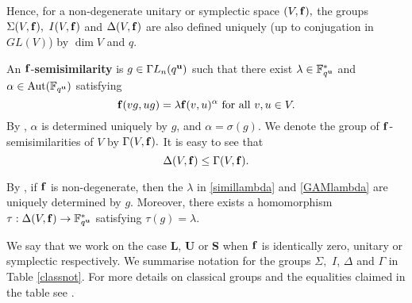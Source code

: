 Hence, for a non-degenerate unitary or symplectic space $(V, {\bf f}),$ the groups $\Sigma(V, {\bf f}),$ $I(V, {\bf f})$ and $\Delta(V, {\bf f})$ are also defined uniquely (up to conjugation in $GL(V)$) by $\dim V$ and $q.$ 



An ${\bf f}$-{\bf semisimilarity}  is $g \in {{\Gamma L}}_n(q^{\bf u})$ such that there exist $\lambda \in \mathbb{F}_{q^{\bf u}}^*$ and $\alpha \in \mathrm{Aut} (\mathbb{F}_{q^{\bf u}})$ satisfying
\begin{equation}
\label{GAMlambda}{\bf f}(vg,ug)=\lambda{\bf f}(v,u)^{\alpha} \text{ for all } v,u \in V.
\end{equation}
By \cite[Lemma 2.1.2]{kleidlieb}, $\alpha$ is determined uniquely by $g$, and $\alpha=\sigma(g).$ We denote the group of ${\bf f}$-semisimilarities of $V$ by $\Gamma(V, {\bf f}).$ It is easy to see that 
$$\Delta(V, {\bf f}) \le \Gamma(V, {\bf f}).$$


\begin{Def}
\label{taudef}
By \cite[Lemma 2.1.2]{kleidlieb}, if ${\bf f}$ is non-degenerate, then the $\lambda$ in \eqref{simillambda} and \eqref{GAMlambda} are uniquely determined by $g$. Moreover, there exists a homomorphism $\tau:\Delta(V, {\bf f}) \to \mathbb{F}_{q^{\bf u}}^*$ satisfying
$\tau(g)=\lambda.$
\end{Def}


We say that we work on the case {\bf L}, {\bf U} or {\bf S}  when ${\bf f}$ is identically zero, unitary or symplectic respectively. We summarise  notation for the groups $\Sigma,$ $I$, $\Delta$ and $\Gamma$ in Table \ref{classnot}. For more details on classical groups and the  equalities claimed in the table  see \cite[\S 2.1]{kleidlieb}. 

